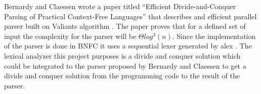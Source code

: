 Bernardy and Claessen \cite{bernardyefficient2013} wrote a paper titled 
``Efficient Divide-and-Conquer Parsing of Practical Context-Free Languages''
that describes and efficient parallel parser built on Valiants algorithm
\cite{valiantgeneral1975}. The paper proves that for a defined set of input
the complexity for the parser will be $\Theta log^3(n)$.
Since the implementation of the parser is done in BNFC \cite{bnfc} it uses a
sequential lexer generated by alex \cite{alex}. The lexical analyzer this
project purposes is a divide and conquer solution which could be integrated to
the parser proposed by Bernardy and Claessen to get a divide and conquer
solution from the programming code to the result of the parser.
